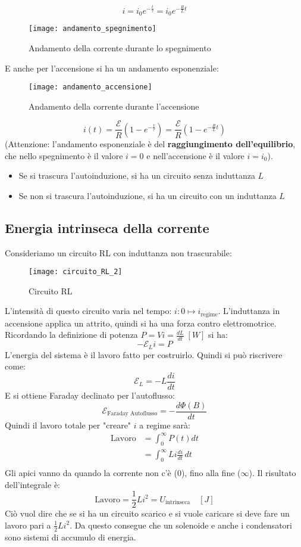 \documentclass[a4paper]{article}
\begin{document}
\[
  i = i_0 e^{-\frac{t}{\tau}} = i_0 e^{-\frac{R}{L} t}
\] 
\begin{figure}[H]
  \centering
  \texttt{[image: andamento\_spegnimento]}
  \caption{Andamento della corrente durante lo spegnimento}
\end{figure}
E anche per l'accensione si ha un andamento esponenziale:
\begin{figure}[H]
  \centering
  \texttt{[image: andamento\_accensione]}
  \caption{Andamento della corrente durante l'accensione}
\end{figure}
\[
  i(t) = \frac{\mathcal{E}}{R} \left( 1 - e^{-\frac{t}{\tau}} \right) = \frac{\mathcal{E}}{R} \left( 1 - e^{-\frac{R}{L} t} \right)
\] 
(Attenzione: l'andamento esponenziale è del \textbf{raggiungimento dell'equilibrio}, che
nello spegnimento è il valore \( i = 0 \) e nell'accensione è il valore \( i = i_0 \)).
\begin{itemize}
  \item Se si trascura l'autoinduzione, si ha un circuito senza induttanza \( L \)
  \item Se non si trascura l'autoinduzione, si ha un circuito con un induttanza \( L \) 
\end{itemize}


\subsection{Energia intrinseca della corrente}
Consideriamo un circuito RL con induttanza non trascurabile:
\begin{figure}[H]
  \centering
  \texttt{[image: circuito\_RL\_2]}
  \caption{Circuito RL}
\end{figure}
\noindent
L'intensità di questo circuito varia nel tempo: \( i: 0 \mapsto i_{\text{regime}} \).
L'induttanza in accensione applica un attrito, quindi si ha una forza contro
elettromotrice. Ricordando la definizione di potenza \( P = Vi = \frac{dL}{dt} \; \left[ W \right] \) si ha:
\[
  -\mathcal{E}_L i = P
\] 
L'energia del sistema è il lavoro fatto per costruirlo. Quindi si può riscrivere come:
\[
  \mathcal{E}_L = - L \frac{di}{dt}
\] 
E si ottiene Faraday declinato per l'autoflusso:
\[
  \mathcal{E}_{\text{Faraday Autoflusso}} = - \frac{d \Phi (B)}{dt}
\] 
Quindi il lavoro totale per "creare" \( i \) a regime sarà:
\[
  \begin{aligned}
    \text{Lavoro} &= \int_0^\infty P(t) dt\\
      &= \int_0^\infty Li \frac{di}{dt} \, dt\\
  \end{aligned}
\] 
Gli apici vanno da quando la corrente non c'è (\( 0 \)), fino alla fine (\( \infty \)).
Il risultato dell'integrale è:
\[
  \text{Lavoro} = \frac{1}{2} L i^2 = U_{\text{intrinseca}} \quad \left[ J \right]
\] 
Ciò vuol dire che se si ha un circuito scarico e si vuole caricare si deve fare un lavoro
pari a \( \frac{1}{2} Li^2 \). Da questo consegue che un solenoide e anche i condensatori
sono sistemi di accumulo di energia.
\end{document}
